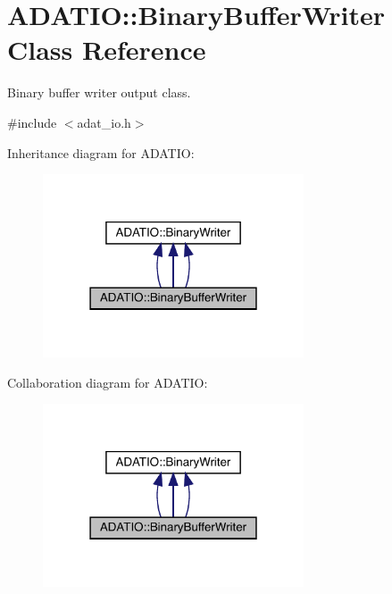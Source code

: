 \hypertarget{classADATIO_1_1BinaryBufferWriter}{}\section{A\+D\+A\+T\+IO\+:\+:Binary\+Buffer\+Writer Class Reference}
\label{classADATIO_1_1BinaryBufferWriter}


Binary buffer writer output class.  




{\ttfamily \#include $<$adat\+\_\+io.\+h$>$}



Inheritance diagram for A\+D\+A\+T\+IO\+:
\nopagebreak
\begin{figure}[H]
\begin{center}
\leavevmode
\includegraphics[width=219pt]{d3/d69/classADATIO_1_1BinaryBufferWriter__inherit__graph}
\end{center}
\end{figure}


Collaboration diagram for A\+D\+A\+T\+IO\+:
\nopagebreak
\begin{figure}[H]
\begin{center}
\leavevmode
\includegraphics[width=219pt]{d5/dc5/classADATIO_1_1BinaryBufferWriter__coll__graph}
\end{center}
\end{figure}

